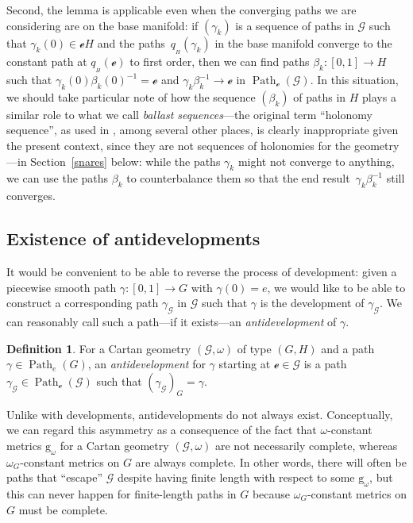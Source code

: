 \documentclass[pdftex]{sigma}
\numberwithin{equation}{section}
\theoremstyle{definition}
\newtheorem{Definition}[Theorem]{Definition}
\DeclareMathOperator{\Path}{Path}
\begin{document}
Second, the lemma is applicable even when the converging paths we are considering are on the base manifold: if $(\gamma_k)$ is a sequence of paths in $\mathscr{G}$ such that $\gamma_k(0)\in\mathscr{e}H$ and the paths~$q_{{}_H}(\gamma_k)$ in the base manifold converge to the constant path at $q_{{}_H}(\mathscr{e})$ to first order, then we can find paths $\beta_k\colon [0,1]\to H$ such that $\gamma_k(0)\beta_k(0)^{-1}=\mathscr{e}$ and $\gamma_k\beta_k^{-1}\rightarrow\mathscr{e}$ in $\Path_\mathscr{e}(\mathscr{G})$. In this situation, we should take particular note of how the sequence $(\beta_k)$ of paths in $H$ plays a similar role to what we call \textit{ballast sequences}---the original term ``holonomy sequence'', as used in \cite{CapMelnick2013,Frances2007,MelnickNeusser2016}, among several other places, is clearly inappropriate given the present context, since they are not sequences of holonomies for the geometry---in Section~\ref{snares} below: while the paths $\gamma_k$ might not converge to anything, we can use the paths $\beta_k$ to counterbalance them so that the end result~$\gamma_k\beta_k^{-1}$ still converges.

\subsection{Existence of antidevelopments}
It would be convenient to be able to reverse the process of development: given a piecewise smooth path $\gamma \colon [0,1]\to G$ with $\gamma(0)=e$, we would like to be able to construct a corresponding path $\gamma_\mathscr{G}$ in $\mathscr{G}$ such that $\gamma$ is the development of $\gamma_\mathscr{G}$. We can reasonably call such a path---if it exists---an \emph{antidevelopment} of $\gamma$.

\begin{Definition}For a Cartan geometry $(\mathscr{G},\omega)$ of type $(G,H)$ and a path $\gamma\in\Path_e(G)$, an \emph{antidevelopment} for $\gamma$ starting at $\mathscr{e}\in\mathscr{G}$ is a path $\gamma_\mathscr{G}\in\Path_\mathscr{e}(\mathscr{G})$ such that $(\gamma_\mathscr{G})_G=\gamma$.\end{Definition}

Unlike with developments, antidevelopments do not always exist. Conceptually, we can regard this asymmetry as a consequence of the fact that $\omega$-constant metrics $\mathrm{g}_\omega$ for a Cartan geometry $(\mathscr{G},\omega)$ are not necessarily complete, whereas $\omega_G$-constant metrics on $G$ are always complete. In other words, there will often be paths that ``escape'' $\mathscr{G}$ despite having finite length with respect to some $\mathrm{g}_\omega$, but this can never happen for finite-length paths in $G$ because $\omega_G$-constant metrics on $G$ must be complete.
\end{document}
